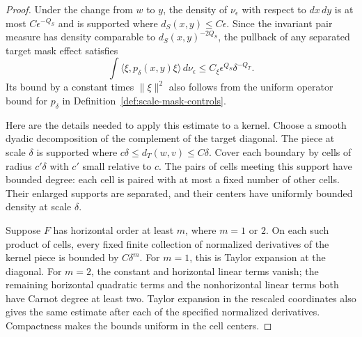 \begin{proof}
Under the change from $w$ to $y$, the density of $\nu_\epsilon$ with
respect to $dx\,dy$ is at most $C\epsilon^{-Q_S}$ and is supported where
$d_S(x,y)\le C\epsilon$.  Since the invariant pair measure has density
comparable to $d_S(x,y)^{-2Q_S}$, the pullback of any separated target
mask effect satisfies
\begin{equation}\label{eq:scale-averaged-mask-bound}
 \int\langle\xi,p_\delta(x,y)\xi\rangle\,d\nu_\epsilon
 \le C_\xi\epsilon^{Q_S}\delta^{-Q_T}.
\end{equation}
Its bound by a constant times $\|\xi\|^2$ also follows from the uniform
operator bound for $p_\delta$ in Definition~\ref{def:scale-mask-controls}.

Here are the details needed to apply this estimate to a kernel.
Choose a smooth dyadic decomposition of the complement of the target
diagonal.  The piece at scale $\delta$ is supported where
$c\delta\le d_T(w,v)\le C\delta$.  Cover each boundary by cells of
radius $c'\delta$ with $c'$ small relative to $c$.  The pairs of cells
meeting this support have bounded degree: each cell is paired with at
most a fixed number of other cells.  Their enlarged supports are
separated, and their centers have uniformly bounded density at scale
$\delta$.

Suppose $F$ has horizontal order at least $m$, where $m=1$ or $2$.
On each such product of cells, every fixed finite collection of
normalized derivatives of the kernel piece is bounded by $C\delta^m$.
For $m=1$, this is Taylor expansion at the diagonal.  For $m=2$, the
constant and horizontal linear terms vanish; the remaining horizontal
quadratic terms and the nonhorizontal linear terms both have Carnot
degree at least two.  Taylor expansion in the rescaled coordinates
also gives the same estimate after each of the specified normalized
derivatives.  Compactness makes the bounds uniform in the cell centers.


\end{proof}
